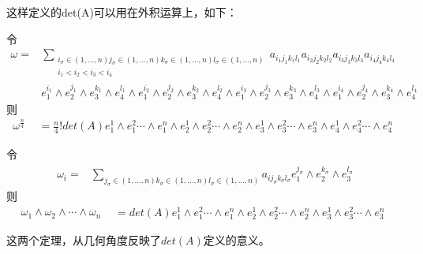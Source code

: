 \documentclass[twoside,a4paper,CCT]{cctart}   %
\begin{document}
这样定义的det(A)可以用在外积运算上，如下：
\begin{theorem}
令
\begin{equation}
\begin{aligned}
\omega=
& \sum_{\substack{i_{\sigma}\in {(1,...,n)} j_{\sigma}\in {(1,...,n)}k_{\sigma}\in {(1,...,n)}l_{\sigma}\in{(1,...,n)}\\ i_{1} < i_{2} < i_{3} < i_{4}}}a_{i_{1}j_{1}k_{1}l_{1}}a_{i_{2}j_{2}k_{2}l_{2}}a_{i_{3}j_{3}k_{3}l_{3}}a_{i_{4}j_{4}k_{4}l_{4}}\\
& e_{1}^{i_{1}} \wedge e_{2}^{j_{1}} \wedge e_{3}^{k_{1}} \wedge e_{4}^{l_{1}} \wedge e_{1}^{i_{2}} \wedge e_{2}^{j_{2}} \wedge e_{3}^{k_{2}} \wedge e_{4}^{l_{2}} \wedge e_{1}^{i_{3}} \wedge e_{2}^{j_{3}} \wedge e_{3}^{k_{3}} \wedge e_{4}^{l_{3}} \wedge e_{1}^{i_{4}} \wedge e_{2}^{j_{4}} \wedge e_{3}^{k_{4}} \wedge e_{4}^{l_{4}}
\end{aligned}\end{equation}
则
\begin{equation}
\omega^{\frac{n}{4}}
\begin{aligned}
& = \frac{n}{4}! det(A) e_{1}^1\wedge e_{1}^2 \cdots \wedge e_{1}^n \wedge e_{2}^1\wedge e_{2}^2 \cdots \wedge e_{2}^n
\wedge e_{3}^1\wedge e_{3}^2 \cdots \wedge e_{3}^n \wedge e_{4}^1\wedge e_{4}^2 \cdots \wedge e_{4}^n
\end{aligned}\end{equation}
\end{theorem}


\begin{theorem}
令
\begin{equation}
\begin{aligned}
\omega_{i}=
& \sum_{j_{\sigma}\in {(1,...,n)}k_{\sigma}\in {(1,...,n)}l_{\sigma}\in{(1,...,n)}}a_{ij_{\sigma}k_{\sigma}l_{\sigma}} e_{1}^{j_{\sigma}} \wedge e_{2}^{k_{\sigma}} \wedge e_{3}^{l_{\sigma}}
\end{aligned}\end{equation}
则
\begin{equation}
\omega_{1}\wedge\omega_{2}\wedge\cdots\wedge\omega_{n}
\begin{aligned}
& = det(A) e_{1}^1\wedge e_{1}^2 \cdots \wedge e_{1}^n \wedge e_{2}^1\wedge e_{2}^2 \cdots \wedge e_{2}^n
\wedge e_{3}^1\wedge e_{3}^2 \cdots \wedge e_{3}^n
\end{aligned}
\end{equation}
\end{theorem}
这两个定理，从几何角度反映了$det(A)$定义的意义。
\end{document}

